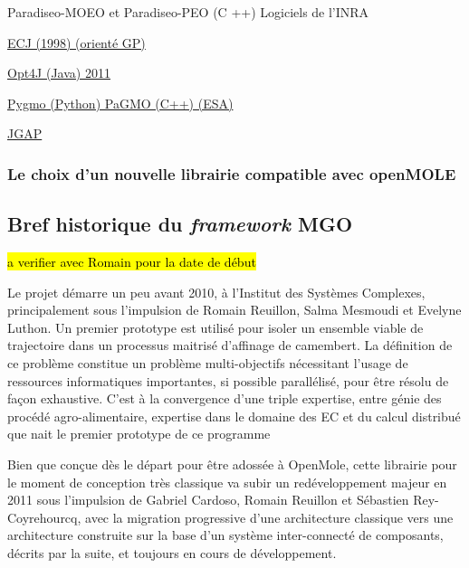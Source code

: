 Paradiseo-MOEO et Paradiseo-PEO (C ++)
Logiciels de l'INRA

\href{http://cs.gmu.edu/~eclab/projects/ecj/}{ECJ (1998) (orienté GP)}

\href{http://opt4j.sourceforge.net/}{Opt4J (Java) 2011}

\href{http://esa.github.io/pygmo/}{Pygmo (Python) PaGMO (C++) (ESA)}

\href{http://jgap.sourceforge.net/}{JGAP}


\subsubsection{Le choix d'un nouvelle librairie compatible avec openMOLE}
\label{sssec:choix_lib_EA}



\subsection{Bref historique du \textit{framework} MGO}
\label{ssec:historique_mgo}

\hl{a verifier avec Romain pour la date de début}

Le projet démarre un peu avant 2010, à l'Institut des Systèmes Complexes, principalement sous l'impulsion de Romain Reuillon, Salma Mesmoudi et Evelyne Luthon. Un premier prototype est utilisé pour isoler un ensemble viable de trajectoire dans un processus maitrisé d'affinage de camembert. La définition de ce problème constitue un problème multi-objectifs nécessitant l'usage de ressources informatiques importantes, si possible parallélisé, pour être résolu de façon exhaustive. C'est à la convergence d'une triple expertise, entre génie des procédé agro-alimentaire, expertise dans le domaine des EC et du calcul distribué que nait le premier prototype de ce programme \autocite{Mesmoudi2010}

Bien que conçue dès le départ pour être adossée à OpenMole, cette librairie pour le moment de conception très classique va subir un redéveloppement majeur en 2011 sous l'impulsion de Gabriel Cardoso, Romain Reuillon et Sébastien Rey-Coyrehourcq, avec la migration progressive d'une architecture classique vers une architecture construite sur la base d'un système inter-connecté de composants, décrits par la suite, et toujours en cours de développement. 

